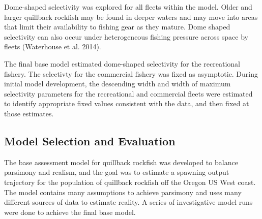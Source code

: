 \documentclass[11pt,
  english,
  a4paper,
]{article}
\begin{document}
\leavevmode\tagmcend\tagstructend\par


Dome-shaped selectivity was explored for all fleets within the model. Older and larger quillback rockfish may be found in deeper waters and may move into areas that limit their availability to fishing gear as they mature. Dome shaped selectivity can also occur under heterogeneous fishing pressure across space by fleets {(Waterhouse et al. 2014)\leavevmode\tagmcend\tagstructend}.

\leavevmode\tagmcend\tagstructend\par


The final base model estimated dome-shaped selectivity for the recreational fishery. The selectivty for the commercial fishery was fixed as asymptotic. During initial model development, the descending width and width of maximum selectivity parameters for the recreational and commercial fleets were estimated to identify appropriate fixed values consistent with the data, and then fixed at those estimates.

\leavevmode\tagmcend\tagstructend\par


\hypertarget{model-selection-and-evaluation}{%
\subsection{Model Selection and Evaluation}\label{model-selection-and-evaluation}}

\leavevmode\tagmcend\tagstructend


The base assessment model for quillback rockfish was developed to balance parsimony and realism, and the goal was to estimate a spawning output trajectory for the population of quillback rockfish off the Oregon US West coast. The model contains many assumptions to achieve parsimony and uses many different sources of data to estimate reality. A series of investigative model runs were done to achieve the final base model.

\leavevmode\tagmcend\tagstructend\par
\end{document}
